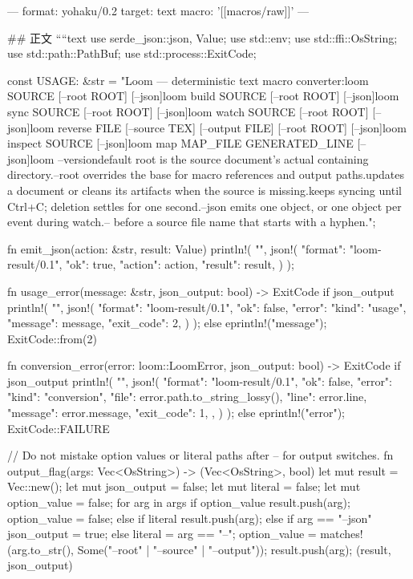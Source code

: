 ---
format: yohaku/0.2
target: text
macro: '[[macros/raw]]'
---

## 正文
````text
use serde_json::{json, Value};
use std::env;
use std::ffi::OsString;
use std::path::PathBuf;
use std::process::ExitCode;

const USAGE: &str = "Loom — deterministic text macro converter\n\nUsage:\n  loom SOURCE [--root ROOT] [--json]\n  loom build SOURCE [--root ROOT] [--json]\n  loom sync SOURCE [--root ROOT] [--json]\n  loom watch SOURCE [--root ROOT] [--json]\n  loom reverse FILE [--source TEX] [--output FILE] [--root ROOT] [--json]\n  loom inspect SOURCE [--json]\n  loom map MAP_FILE GENERATED_LINE [--json]\n  loom --version\n\nThe default root is the source document's actual containing directory.\n--root overrides the base for macro references and output paths.\nsync updates a document or cleans its artifacts when the source is missing.\nwatch keeps syncing until Ctrl+C; deletion settles for one second.\n--json emits one object, or one object per event during watch.\nUse -- before a source file name that starts with a hyphen.\n";

fn emit_json(action: &str, result: Value) {
    println!(
        "{}",
        json!({
            "format": "loom-result/0.1", "ok": true,
            "action": action, "result": result,
        })
    );
}

fn usage_error(message: &str, json_output: bool) -> ExitCode {
    if json_output {
        println!(
            "{}",
            json!({
                "format": "loom-result/0.1", "ok": false,
                "error": {"kind": "usage", "message": message, "exit_code": 2},
            })
        );
    } else {
        eprintln!("{message}\n{}");
    }
    ExitCode::from(2)
}

fn conversion_error(error: loom::LoomError, json_output: bool) -> ExitCode {
    if json_output {
        println!(
            "{}",
            json!({
                "format": "loom-result/0.1", "ok": false,
                "error": {
                    "kind": "conversion", "file": error.path.to_string_lossy(),
                    "line": error.line, "message": error.message, "exit_code": 1,
                },
            })
        );
    } else {
        eprintln!("{error}");
    }
    ExitCode::FAILURE
}

// Do not mistake option values or literal paths after -- for output switches.
fn output_flag(args: Vec<OsString>) -> (Vec<OsString>, bool) {
    let mut result = Vec::new();
    let mut json_output = false;
    let mut literal = false;
    let mut option_value = false;
    for arg in args {
        if option_value {
            result.push(arg);
            option_value = false;
        } else if literal {
            result.push(arg);
        } else if arg == "--json" {
            json_output = true;
        } else {
            literal = arg == "--";
            option_value = matches!(arg.to_str(), Some("--root" | "--source" | "--output"));
            result.push(arg);
        }
    }
    (result, json_output)
}

